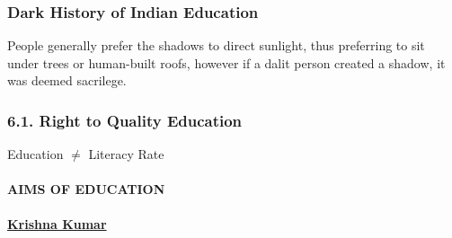 \subsubsection{Dark History of Indian
Education}\label{dark-history-of-indian-education}

People generally prefer the shadows to direct sunlight, thus preferring
to sit under trees or human-built roofs, however if a dalit person
created a shadow, it was deemed sacrilege.

\subsubsection{6.1. Right to Quality
Education}\label{right-to-quality-education}

Education \(\neq\) Literacy Rate

\paragraph{AIMS OF EDUCATION}\label{aims-of-education}

\href{https://ncert.nic.in/pdf/nc-framework/nf2005-english.pdf}{\textbf{Krishna
Kumar}}

